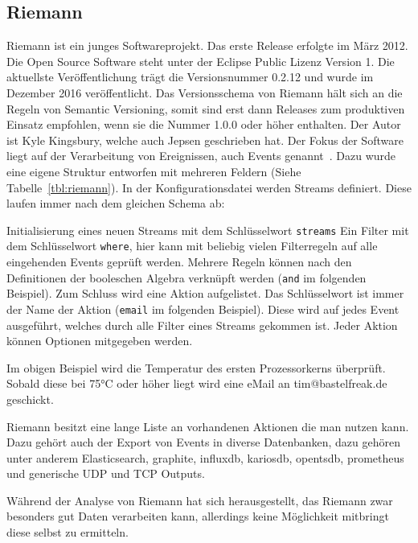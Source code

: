 \subsection{Riemann}
Riemann ist ein junges Softwareprojekt. Das erste Release erfolgte im März
2012. Die Open Source Software steht unter der Eclipse Public Lizenz Version 1.
Die aktuellste Veröffentlichung trägt die Versionsnummer 0.2.12 und wurde im
Dezember 2016 veröffentlicht. Das Versionsschema von Riemann hält sich an die
Regeln von \gls{Semantic Versioning}, somit sind erst dann Releases zum
produktiven Einsatz empfohlen, wenn sie die Nummer 1.0.0 oder höher enthalten.
Der Autor ist Kyle Kingsbury, welche auch \gls{Jepsen} geschrieben hat. Der
Fokus der Software liegt auf der Verarbeitung von Ereignissen, auch Events
genannt~\cite{riemann_concepts}. Dazu wurde eine eigene Struktur entworfen mit
mehreren Feldern (Siehe Tabelle~\ref{tbl:riemann}). In der Konfigurationsdatei
werden Streams definiert. Diese laufen immer nach dem gleichen Schema ab:

\begin{outline}
  \lstset{language=Clojure}
  \1 Initialisierung eines neuen Streams mit dem Schlüsselwort
  \lstinline|streams|
  \1 Ein Filter mit dem Schlüsselwort \lstinline|where|, hier kann mit beliebig
  vielen Filterregeln auf alle eingehenden Events geprüft werden. Mehrere
  Regeln können nach den Definitionen der booleschen Algebra verknüpft werden
  (\lstinline|and| im folgenden Beispiel).
  \1 Zum Schluss wird eine Aktion aufgelistet. Das Schlüsselwort ist immer der
  Name der Aktion (\lstinline|email| im folgenden Beispiel). Diese wird auf
  jedes Event ausgeführt, welches durch alle Filter eines Streams gekommen ist.
  Jeder Aktion können Optionen mitgegeben werden.
\end{outline}



Im obigen Beispiel wird die Temperatur des ersten Prozessorkerns überprüft.
Sobald diese bei 75°C oder höher liegt wird eine eMail an tim@bastelfreak.de
geschickt.

Riemann besitzt eine lange Liste an vorhandenen Aktionen die man nutzen kann.
Dazu gehört auch der Export von Events in diverse Datenbanken, dazu gehören
unter anderem Elasticsearch, graphite, influxdb, kariosdb, opentsdb, prometheus
und generische UDP und TCP Outputs.

Während der Analyse von Riemann hat sich herausgestellt, das Riemann zwar
besonders gut Daten verarbeiten kann, allerdings keine Möglichkeit mitbringt
diese selbst zu ermitteln.
\tm%


